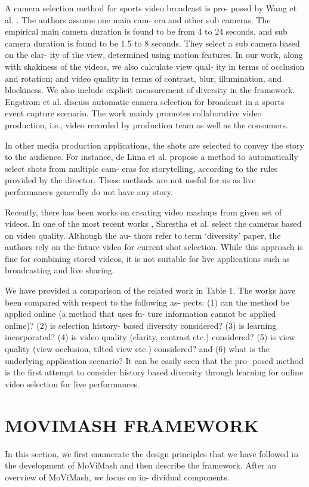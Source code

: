 \documentclass{sig-alternate}
\begin{document}
A camera selection method for sports video broadcast is pro-
posed by Wang et al. \cite{16}. The authors assume one main cam-
era and other sub cameras. The empirical main camera duration is
found to be from 4 to 24 seconds, and sub camera duration is found
to be 1.5 to 8 seconds. They select a sub camera based on the clar-
ity of the view, determined using motion features. In our work,
along with shakiness of the videos, we also calculate view qual-
ity in terms of occlusion and rotation; and video quality in terms
of contrast, blur, illumination, and blockiness. We also include
explicit measurement of diversity in the framework. Engstrom et
al. \cite{8} discuss automatic camera selection for broadcast in a sports
event capture scenario. The work mainly promotes collaborative
video production, i.e., video recorded by production team as well
as the consumers.

In other media production applications, the shots are selected to
convey the story to the audience. For instance, de Lima et al. \cite{7} propose a method to automatically select shots from multiple cam-
eras for storytelling, according to the rules provided by the director.
These methods are not useful for us as live performances generally
do not have any story.

Recently, there has been works on creating video mashups from
given set of videos. In one of the most recent works \cite{15}, Shrestha
et al. select the cameras based on video quality. Although the au-
thors refer to term ‘diversity’ paper, the authors rely on the
future video for current shot selection. While this approach is fine
for combining stored videos, it is not suitable for live applications
such as broadcasting and live sharing.

We have provided a comparison of the related work in Table 1.
The works have been compared with respect to the following as-
pects: (1) can the method be applied online (a method that uses fu-
ture information cannot be applied online)? (2) is selection history-
based diversity considered? (3) is learning incorporated? (4) is
video quality (clarity, contrast etc.) considered? (5) is view quality
(view occlusion, tilted view etc.) considered? and (6) what is the
underlying application scenario? It can be easily seen that the pro-
posed method is the first attempt to consider history based diversity
through learning for online video selection for live performances.
\section{MOVIMASH FRAMEWORK} In this section, we first enumerate the design principles that we
have followed in the development of MoViMash and then describe
the framework. After an overview of MoViMash, we focus on in-
dividual components.
\end{document}
